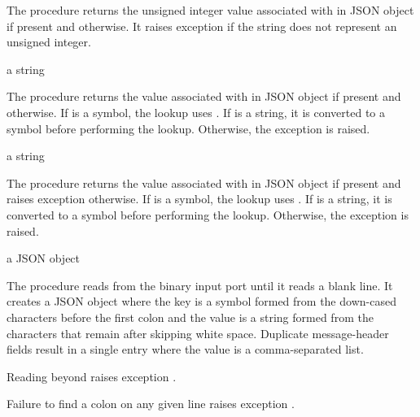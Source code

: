 The  procedure returns the unsigned
integer value associated with  in JSON object
 if present and  otherwise. It raises exception
 if the 
string does not represent an unsigned integer.

\begin{procedure}
\end{procedure}
\returns{} a string \alt{} 

The  procedure returns the value associated with
 in JSON object  if present and 
otherwise.  If  is a symbol, the lookup uses .  If
 is a string, it is converted to a symbol before performing
the lookup.  Otherwise, the exception  is raised.

\begin{procedure}
\end{procedure}
\returns{} a string

The  procedure returns the value associated with
 in JSON object  if present and raises exception
 otherwise.  If  is
a symbol, the lookup uses .  If  is a string, it
is converted to a symbol before performing the lookup.  Otherwise, the
exception  is raised.

\begin{procedure}
\end{procedure}
\returns{} a JSON object

The  procedure reads from the binary input port
 until it reads a blank line.  It creates a JSON object where
the key is a symbol formed from the down-cased characters before the
first colon and the value is a string formed from the characters that
remain after skipping white space.  Duplicate message-header fields
result in a single entry where the value is a comma-separated list.

Reading beyond  raises exception
.

Failure to find a colon on any given line raises exception
.

